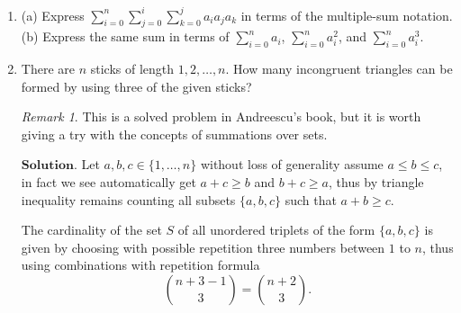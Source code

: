 \documentclass{article}
\theoremstyle{remark}
\newtheorem*{remark}{Remark}
\begin{document}
    \begin{enumerate}
        \item (a) Express \( \sum_{i=0}^{n}\sum_{j=0}^{i}\sum_{k=0}^{j}a_ia_ja_k\) in terms of the multiple-sum notation.\\
        (b) Express the same sum in terms of $\sum_{i=0}^{n}a_i$, $\sum_{i=0}^{n}a_i^2$, and $\sum_{i=0}^{n}a_i^3$.\\

        \item There are \( n \) sticks of length \( 1, 2, \ldots, n \). 
        How many incongruent triangles can be formed by using three of the given sticks?
        \begin{remark}
            This is a solved problem in Andreescu's book, but it is worth giving a try with the concepts of summations over sets.
        \end{remark}
        $\textbf{Solution.}$
        Let $a, b, c \in \{1,\dots, n\}$ without loss of generality assume $a \leq b \leq c$, in fact we see automatically get $a + c \geq b$ and $b + c \geq a$, thus 
        by triangle inequality remains counting all subsets $\{a,b,c\}$ such that $a + b \geq c$.

        The cardinality of the set $S$ of all unordered triplets of the form $\{a,b,c\}$ is given by 
        choosing with possible repetition three numbers between $1$ to $n$, thus using combinations with repetition formula
        \[
        \binom{n+3-1}{3} = \binom{n+2}{3}.
        \]


\end{enumerate}
\end{document}
